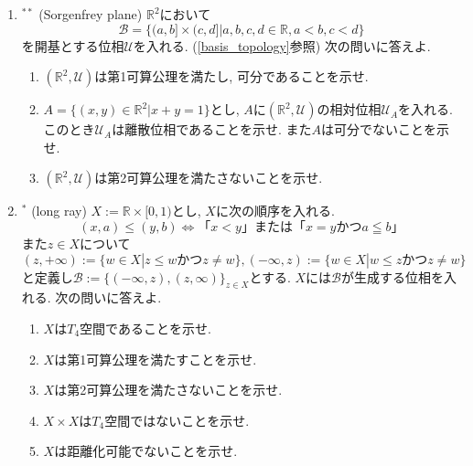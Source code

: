 \documentclass[dvipdfmx,a4paper,11pt]{article}
\newcommand{\R}{\mathbb{R}}
\theoremstyle{definition}
\begin{document}
\begin{enumerate}[label=\textbf{問}\ref*{sec-countable}.\arabic*]
	\setlength{\parskip}{0cm} 
  \setlength{\itemsep}{7pt} 
	
\item  \label{Sor2} $^{**}$ (Sorgenfrey plane) $\R^2$において
$$
\mathscr{B} = \{(a,b] \times (c,d]| a,b,c,d \in \R, a<b, c<d\} 
$$
を開基とする位相$\mathscr{U}$を入れる. (\ref{basis_topology}参照)
次の問いに答えよ. 
	 \begin{enumerate}
	 	\setlength{\parskip}{0cm} 
  \setlength{\itemsep}{0pt} 
	\item $(\R^2,\mathscr{U})$は第1可算公理を満たし, 可分であることを示せ.
	\item $ A=\{ (x,y)\in \R^2 | x+y=1\}$とし, $A$に$(\R^2,\mathscr{U})$の相対位相$\mathscr{U}_A$を入れる. このとき$\mathscr{U}_A$は離散位相であることを示せ. また$A$は可分でないことを示せ.
	\item $(\R^2,\mathscr{U})$は第2可算公理を満たさないことを示せ.
	\end{enumerate}
\item \label{longray}$^{*}$ (long ray) $X:=\R \times [0,1)$とし, $X$に次の順序を入れる.
	$$
(x,a) \le (y,b) \Leftrightarrow \text{「$x<y$」または「$x=y$かつ$a \leqq b$」} 
	$$	
また$z \in X$について
$$(z, +\infty):=\{ w \in X| z \le w \text{かつ} z \neq w\}, 
(-\infty, z):=\{ w \in X| w \le z \text{かつ} z \neq w\}$$
と定義し$\mathcal{B} := \{ (-\infty, z),  (z, \infty)\}_{z \in X}$とする. 
$X$には$\mathcal{B}$が生成する位相を入れる. 
次の問いに答えよ.
 \begin{enumerate}
 	\setlength{\parskip}{0cm} 
  \setlength{\itemsep}{0pt} 
 \item $X$は$T_4$空間であることを示せ.
 \item $X$は第1可算公理を満たすことを示せ.
\item $X$は第2可算公理を満たさないことを示せ.
\item $X \times X$は$T_4$空間ではないことを示せ.
\item $X$は距離化可能でないことを示せ.
\end{enumerate}

\end{enumerate}
\end{document}
